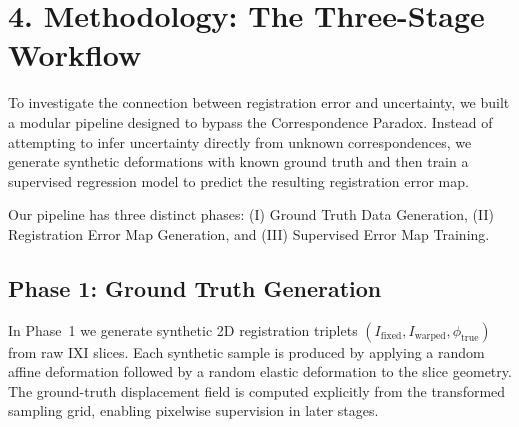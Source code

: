 
\section{4. Methodology: The Three-Stage Workflow}
To investigate the connection between registration error and uncertainty, we built a modular pipeline designed to bypass the Correspondence Paradox. Instead of attempting to infer uncertainty directly from unknown correspondences, we generate synthetic deformations with known ground truth and then train a supervised regression model to predict the resulting registration error map.

Our pipeline has three distinct phases: (I) Ground Truth Data Generation, (II) Registration Error Map Generation, and (III) Supervised Error Map Training.

\subsection{Phase 1: Ground Truth Generation}
In Phase~1 we generate synthetic 2D registration triplets $(I_{\text{fixed}}, I_{\text{warped}}, \phi_{\text{true}})$ from raw IXI slices. Each synthetic sample is produced by applying a random affine deformation followed by a random elastic deformation to the slice geometry. The ground-truth displacement field is computed explicitly from the transformed sampling grid, enabling pixelwise supervision in later stages.

